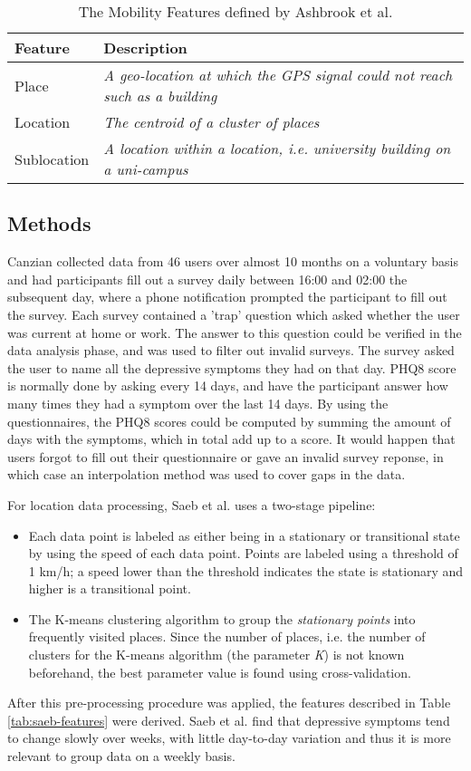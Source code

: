 \begin{table}[]
    \centering
\begin{tabular}{|p{}|p{}|}
\hline
\textbf{Feature} & \textbf{Description}                                                               \\ \hline
Place            & \textit{A geo-location at which the GPS signal could not reach such as a building} \\ \hline
Location         & \textit{The centroid of a cluster of places}                                       \\ \hline
Sublocation      & \textit{A location within a location, i.e. university building on a uni-campus}    \\ \hline
\end{tabular}
    \caption{The Mobility Features defined by Ashbrook et al. \cite{learning_significant_locations}}
    \label{tab:features-ashbrook}
\end{table}


\subsection{Methods}
Canzian collected data from 46 users over almost 10 months on a voluntary basis and had participants fill out a survey daily between 16:00 and 02:00 the subsequent day, where a phone notification prompted the participant to fill out the survey. Each survey contained a 'trap' question which asked whether the user was current at home or work. The answer to this question could be verified in the data analysis phase, and was used to filter out invalid surveys. The survey asked the user to name all the depressive symptoms they had on that day. PHQ8 score is normally done by asking every 14 days, and have the participant answer how many times they had a symptom over the last 14 days. By using the questionnaires, the PHQ8 scores could be computed by summing the amount of days with the symptoms, which in total add up to a score. It would happen that users forgot to fill out their questionnaire or gave an invalid survey reponse, in which case an interpolation method was used to cover gaps in the data. 

For location data processing, Saeb et al. uses a two-stage pipeline: 
\begin{itemize}
    \item Each data point is labeled as either being in a stationary or transitional state by using the speed of each data point. Points are labeled using a threshold of 1 km/h; a speed lower than the threshold indicates the state is stationary and higher is a transitional point. 
    \item The K-means clustering algorithm to group the \textit{stationary points} into frequently visited places. Since the number of places, i.e. the number of clusters for the K-means algorithm (the parameter \textit{K}) is not known beforehand, the best parameter value is found using cross-validation.
\end{itemize}

After this pre-processing procedure was applied, the features described in Table \ref{tab:saeb-features} were derived.
Saeb et al. find that depressive symptoms tend to change slowly over weeks, with little day-to-day variation and thus it is more relevant to group data on a weekly basis.




